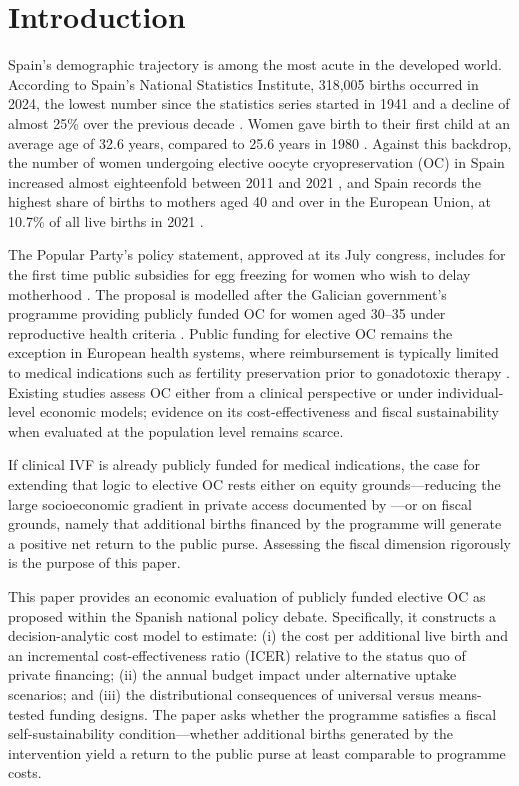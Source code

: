 \documentclass[12pt,a4paper]{article}
\begin{document}
\section{Introduction}\label{sec:introduction}

Spain's demographic trajectory is among the most acute in the
developed world. According to Spain's National Statistics Institute,
318,005 births occurred in 2024, the lowest number since the
statistics series started in 1941 and a decline of almost 25\% over
the previous decade \citep{ine2025mnp,funcas2024}. Women gave birth to
their first child at an average age of 32.6 years, compared to 25.6
years in 1980 \citep{funcas2024}. Against this backdrop, the number of
women undergoing elective oocyte cryopreservation (OC) in Spain
increased almost eighteenfold between 2011 and 2021
\citep{sef2024registro}, and Spain records the highest share of births
to mothers aged 40 and over in the European Union, at 10.7\% of all
live births in 2021 \citep{blas2025}.

The Popular Party's policy statement, approved at its July congress,
includes for the first time public subsidies for egg freezing for women
who wish to delay motherhood \citep{blas2025,partidopopular2025}. The
proposal is modelled after the Galician government's programme
providing publicly funded OC for women aged 30--35 under reproductive
health criteria \citep{xunta2024}. Public funding for elective OC
remains the exception in European health systems, where reimbursement
is typically limited to medical indications such as fertility
preservation prior to gonadotoxic therapy
\citep{shenfield2017,gambadauro2023}. Existing studies assess OC
either from a clinical perspective or under individual-level economic
models; evidence on its cost-effectiveness and fiscal sustainability
when evaluated at the population level remains scarce.

If clinical IVF is already publicly funded for medical indications,
the case for extending that logic to elective OC rests either on
equity grounds---reducing the large socioeconomic gradient in private
access documented by \citet{alonpinilla2021}---or on fiscal grounds,
namely that additional births financed by the programme will generate a
positive net return to the public purse. Assessing the fiscal dimension
rigorously is the purpose of this paper.

This paper provides an economic evaluation of publicly funded elective
OC as proposed within the Spanish national policy debate. Specifically,
it constructs a decision-analytic cost model to estimate: (i) the cost
per additional live birth and an incremental cost-effectiveness ratio
(ICER) relative to the status quo of private financing; (ii) the
annual budget impact under alternative uptake scenarios; and (iii) the
distributional consequences of universal versus means-tested funding
designs. The paper asks whether the programme satisfies a fiscal
self-sustainability condition---whether additional births generated by
the intervention yield a return to the public purse at least comparable
to programme costs.
\end{document}
